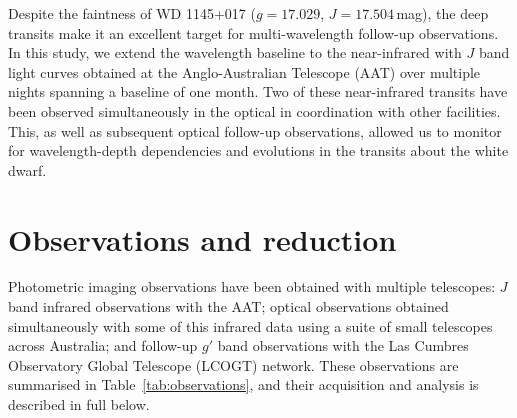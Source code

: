 \documentclass[useAMS,usenatbib]{mn2e}
\begin{document}
Despite the faintness of WD 1145+017 ($g=17.029$, $J=17.504$\,mag), the deep transits make it an excellent target for multi-wavelength follow-up observations. In this study, we extend the wavelength baseline to the near-infrared with $J$ band light curves obtained at the Anglo-Australian Telescope (AAT) over multiple nights spanning a baseline of one month. Two of these near-infrared transits have been observed simultaneously in the optical in coordination with other facilities. This, as well as subsequent optical follow-up observations, allowed us to monitor for wavelength-depth dependencies and evolutions in the transits about the white dwarf.

\section{Observations and reduction}
\label{sec:observations}

Photometric imaging observations have been obtained with multiple telescopes: $J$ band infrared observations with the AAT; optical observations 
obtained simultaneously with some of this infrared data using a suite of small telescopes across Australia; and follow-up $g'$ band observations with the Las Cumbres Observatory Global Telescope (LCOGT) network. These observations are summarised in Table~\ref{tab:observations}, and their acquisition and analysis is described in full below.
\end{document}
